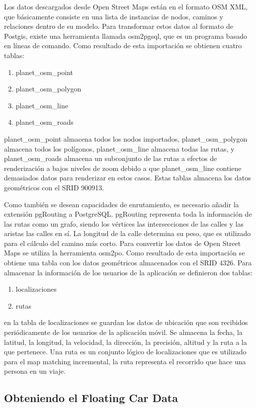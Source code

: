 Los datos descargados desde Open Street Maps están en el formato OSM XML, que básicamente consiste en una lista de instancias de nodos, caminos y relaciones dentro de su modelo. Para transformar estos datos al formato de Postgis, existe una herramienta llamada osm2pgsql, que es un programa basado en líneas de comando. Como resultado de esta importación se obtienen cuatro tablas:
\begin{enumerate}
\item planet\_osm\_point 
\item planet\_osm\_polygon
\item planet\_osm\_line
\item planet\_osm\_roads
\end{enumerate}
planet\_osm\_point almacena todos los nodos importados, planet\_osm\_polygon almacena todos los polígonos, planet\_osm\_line almacena todas las rutas, y planet\_osm\_roads almacena un subconjunto de las rutas a efectos de renderización a bajos niveles de zoom debido a que planet\_osm\_line contiene demasiados datos para renderizar en estos casos. Estas tablas almacena los datos geométricos con el SRID 900913.

Como también se desean capacidades de enrutamiento, es necesario añadir la extensión pgRouting a PostgreSQL. pgRouting representa toda la información de las rutas como un grafo, siendo los vértices las intersecciones de las calles y las aristas las calles en sí. La longitud de la calle determina su peso, que es utilizado para el cálculo del camino más corto. Para convertir los datos de Open Street Maps se utiliza la herramienta osm2po. Como resultado de esta importación se obtiene una tabla con los datos geométricos almacenados con el SRID 4326.
Para almacenar la información de los usuarios de la aplicación se definieron dos tablas:
\begin{enumerate}
\item localizaciones
\item rutas
\end{enumerate}
en la tabla de localizaciones se guardan los datos de ubicación que son recibidos periódicamente de los usuarios de la aplicación móvil. Se almacena la fecha, la latitud, la longitud, la velocidad, la dirección, la precisión, altitud y la ruta a la que pertenece. Una ruta es un conjunto lógico de localizaciones que es utilizado para el map matching incremental, la ruta representa el recorrido que hace una persona en un viaje.

\subsection{Obteniendo el Floating Car Data}

